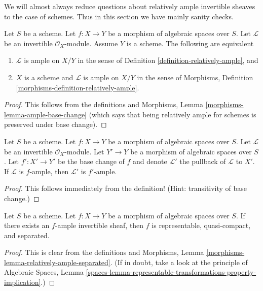 \noindent
We will almost always reduce questions about relatively ample invertible
sheaves to the case of schemes. Thus in this section we have
mainly sanity checks.

\begin{lemma}
\label{lemma-relatively-ample-sanity-check}
Let $S$ be a scheme.
Let $f : X \to Y$ be a morphism of algebraic spaces over $S$.
Let $\mathcal{L}$ be an invertible $\mathcal{O}_X$-module.
Assume $Y$ is a scheme. The following are equivalent
\begin{enumerate}
\item $\mathcal{L}$ is ample on $X/Y$ in the sense of
Definition \ref{definition-relatively-ample}, and
\item $X$ is a scheme and $\mathcal{L}$ is ample on $X/Y$
in the sense of
Morphisms, Definition \ref{morphisms-definition-relatively-ample}.
\end{enumerate}
\end{lemma}

\begin{proof}
This follows from the definitions and
Morphisms, Lemma \ref{morphisms-lemma-ample-base-change}
(which says that being relatively ample for schemes
is preserved under base change).
\end{proof}

\begin{lemma}
\label{lemma-ample-base-change}
Let $S$ be a scheme.
Let $f : X \to Y$ be a morphism of algebraic spaces over $S$.
Let $\mathcal{L}$ be an invertible $\mathcal{O}_X$-module.
Let $Y' \to Y$ be a morphism of algebraic spaces over $S$.
Let $f' : X' \to Y'$ be the base change of $f$ and denote
$\mathcal{L}'$ the pullback of $\mathcal{L}$ to $X'$.
If $\mathcal{L}$ is $f$-ample, then $\mathcal{L}'$ is $f'$-ample.
\end{lemma}

\begin{proof}
This follows immediately from the definition!
(Hint: transitivity of base change.)
\end{proof}

\begin{lemma}
\label{lemma-relatively-ample-properties}
Let $S$ be a scheme.
Let $f : X \to Y$ be a morphism of algebraic spaces over $S$.
If there exists an $f$-ample invertible sheaf, then
$f$ is representable, quasi-compact, and separated.
\end{lemma}

\begin{proof}
This is clear from the definitions and
Morphisms, Lemma \ref{morphisms-lemma-relatively-ample-separated}.
(If in doubt, take a look at the principle of
Algebraic Spaces, Lemma
\ref{spaces-lemma-representable-transformations-property-implication}.)
\end{proof}

